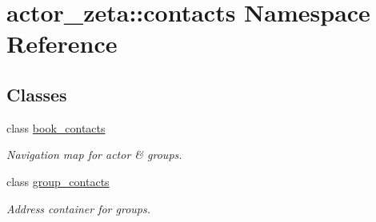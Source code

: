 \hypertarget{namespaceactor__zeta_1_1contacts}{}\section{actor\+\_\+zeta\+:\+:contacts Namespace Reference}
\label{namespaceactor__zeta_1_1contacts}
\subsection*{Classes}
\begin{DoxyCompactItemize}
\item 
class \hyperlink{classactor__zeta_1_1contacts_1_1book__contacts}{book\+\_\+contacts}
\begin{DoxyCompactList}\small\item\em Navigation map for actor \& groups. \end{DoxyCompactList}\item 
class \hyperlink{classactor__zeta_1_1contacts_1_1group__contacts}{group\+\_\+contacts}
\begin{DoxyCompactList}\small\item\em Address container for groups. \end{DoxyCompactList}\end{DoxyCompactItemize}
